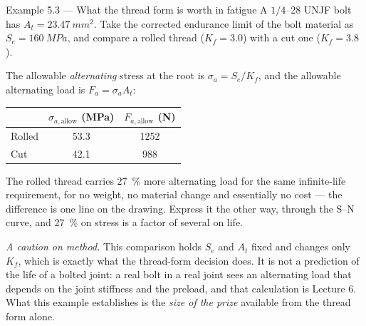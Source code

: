 \documentclass[11pt,a4paper]{article}
\begin{document}
\begin{examplebox}{Example 5.3 --- What the thread form is worth in fatigue}
A $1/4$--28 UNJF bolt has $A_t = \SI{23.47}{mm^2}$. Take the corrected endurance limit of the bolt
material as $S_e = \SI{160}{MPa}$, and compare a rolled thread ($K_f = 3.0$) with a cut one
($K_f = 3.8$).

\medskip
The allowable \emph{alternating} stress at the root is $\sigma_{a} = S_e/K_f$, and the allowable
alternating load is $F_a = \sigma_a A_t$:
\begin{center}\small
\begin{tabular}{@{}lcc@{}}
\toprule
 & $\sigma_{a,\text{allow}}$ (\si{MPa}) & $F_{a,\text{allow}}$ (\si{N})\\
\midrule
Rolled & 53.3 & 1252\\
Cut & 42.1 & 988\\
\bottomrule
\end{tabular}
\end{center}

\medskip
The rolled thread carries \SI{27}{\percent} more alternating load for the same infinite-life
requirement, for no weight, no material change and essentially no cost --- the difference is one line
on the drawing. Express it the other way, through the S--N curve, and \SI{27}{\percent} on stress is a
factor of several on life.

\medskip
\emph{A caution on method.} This comparison holds $S_e$ and $A_t$ fixed and changes only $K_f$, which
is exactly what the thread-form decision does. It is not a prediction of the life of a bolted joint:
a real bolt in a real joint sees an alternating load that depends on the joint stiffness and the
preload, and that calculation is Lecture 6. What this example establishes is the \emph{size of the
prize} available from the thread form alone.
\end{examplebox}
\end{document}

